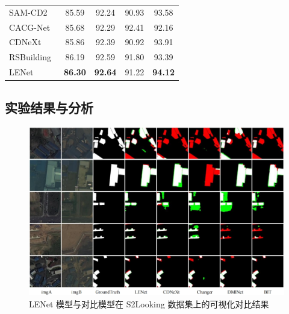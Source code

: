 \begin{table}[!htb]
\begin{tabular}{lcccc}
    SAM-CD2~\cite{Sun2024SegmentAM}       &  85.59  &  92.24 &  90.93  &  93.58  \\
    CACG-Net~\cite{Liu2024CandidateAwareAC}      &  85.68  &  92.29 &  92.41  &  92.16  \\
    CDNeXt~\cite{wei_robust_2024}        &  85.86  &  92.39 &  90.92  &  93.91  \\
    RSBuilding~\cite{wang_rsbuilding_2024}    &  86.19  &  92.59 &  91.80  &  93.39  \\
    LENet                   & \textbf{86.30} & \textbf{92.64} &  91.22  & \textbf{94.12} \\
    \bottomrule
  \end{tabular}
\end{table}



\subsection{实验结果与分析}

\begin{figure}[!htb]
  \centering
  \includegraphics[width=\textwidth]{paper_figures/基于双时相遥感影像特征交互的变化检测算法研究/LENet/lenet_s2looking.png}
  \caption{LENet 模型与对比模型在 S2Looking 数据集上的可视化对比结果}
  \label{fig:lenet_s2looking}
\end{figure}



